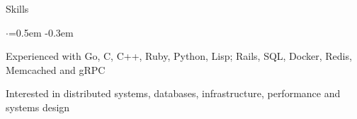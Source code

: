 \documentclass{resume} %
\begin{document}

\begin{rSection}{Skills}
  \vspace {0.3em}
  \begin{list}{$\cdot$}{\leftmargin=0.5em}
    \itemsep -0.3em \vspace{-0.3em}
    \item Experienced with Go, C, C++, Ruby, Python, Lisp; Rails, SQL, Docker, Redis,
      Memcached and gRPC
    \item Interested in distributed systems, databases, infrastructure,
      performance and systems design
  \end{list}
  \vspace{0.3em}
\end{rSection}


\end{document}
